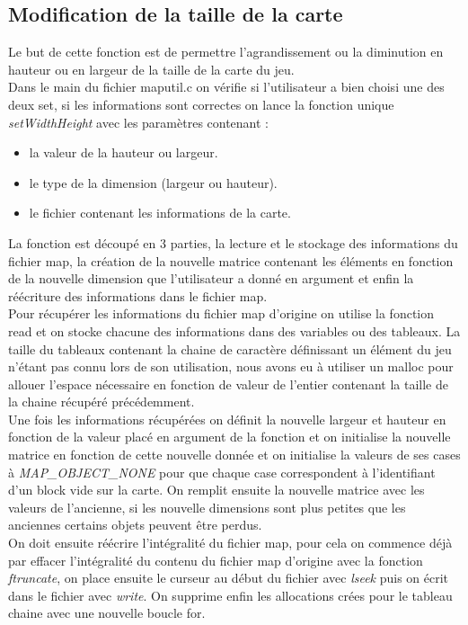 \documentclass[10pt,a4paper]{article}
\begin{document}
\subsection{Modification de la taille de la carte}
\quad Le but de cette fonction est de permettre l'agrandissement ou la diminution en hauteur ou en largeur de la taille de la carte du jeu.\\
\quad Dans le main du fichier maputil.c on vérifie si l'utilisateur a bien choisi une des deux set, si les informations sont correctes on lance la fonction unique \textit{setWidthHeight} avec les paramètres contenant :\\
\begin{itemize}
\item la valeur de la hauteur ou largeur.
\item le type de la dimension (largeur ou hauteur).
\item le fichier contenant les informations de la carte.
\end{itemize}
\quad La fonction est découpé en 3 parties, la lecture et le stockage des informations du fichier map, la création de la nouvelle matrice contenant les éléments en fonction de la nouvelle dimension que l'utilisateur a donné en argument et enfin la réécriture des informations dans le fichier map.\\
\quad Pour récupérer les informations du fichier map d'origine on utilise la fonction read et on stocke chacune des informations dans des variables ou des tableaux. La taille du tableaux contenant la chaine de caractère définissant un élément du jeu n'étant pas connu lors de son utilisation, nous avons eu à utiliser un malloc pour allouer l'espace nécessaire en fonction de valeur de l'entier contenant la taille de la chaine récupéré précédemment.\\
\quad Une fois les informations récupérées on définit la nouvelle largeur et hauteur en fonction de la valeur placé en argument de la fonction et on initialise la nouvelle matrice en fonction de cette nouvelle donnée et on initialise la valeurs de ses cases à \textit{MAP\_OBJECT\_NONE} pour que chaque case correspondent à l'identifiant d'un block vide sur la carte. On remplit ensuite la nouvelle matrice avec les valeurs de l'ancienne, si les nouvelle dimensions sont plus petites que les anciennes certains objets peuvent être perdus.\\
\quad On doit ensuite réécrire l'intégralité du fichier map, pour cela on commence déjà par effacer l'intégralité du contenu du fichier map d'origine avec la fonction \textit{ftruncate}, on place ensuite le curseur au début du fichier avec \textit{lseek} puis on écrit dans le fichier avec \textit{write}. On supprime enfin les allocations crées pour le tableau chaine avec une nouvelle boucle for.        
    
\end{document}

